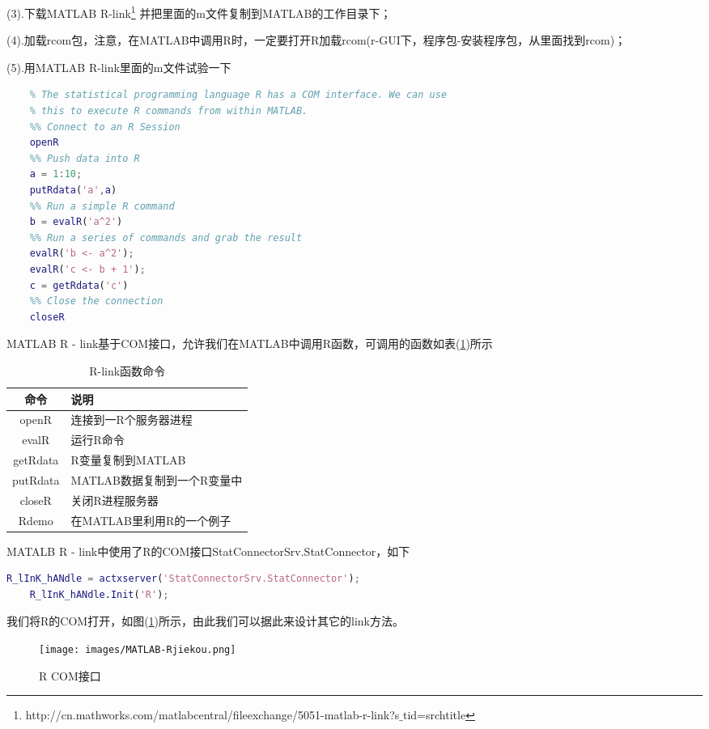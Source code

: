     \par
    \par
    (3).下载MATLAB R-link\footnote{http://cn.mathworks.com/matlabcentral/fileexchange/5051-matlab-r-link?s$\_$tid=srchtitle}
    并把里面的m文件复制到MATLAB的工作目录下；
    \par
    (4).加载rcom包，注意，在MATLAB中调用R时，一定要打开R加载rcom(r-GUI下，程序包-安装程序包，从里面找到rcom)；
    \par
    (5).用MATLAB R-link里面的m文件试验一下
    \begin{lstlisting}[language = Matlab]
    %% Connecting MATLAB to R
    % The statistical programming language R has a COM interface. We can use
    % this to execute R commands from within MATLAB.
    %% Connect to an R Session
    openR
    %% Push data into R
    a = 1:10;
    putRdata('a',a)
    %% Run a simple R command
    b = evalR('a^2')
    %% Run a series of commands and grab the result
    evalR('b <- a^2');
    evalR('c <- b + 1');
    c = getRdata('c')
    %% Close the connection
    closeR
    \end{lstlisting}
    \par
    MATLAB R - link基于COM接口，允许我们在MATLAB中调用R函数，可调用的函数如表(\ref{R-link函数命令})所示
    \begin{table}[H]
    \caption{R-link函数命令}
    \label{R-link函数命令}
    \centering
    \begin{tabular}{c|l}
        \toprule
        命令 & 说明  \\
        \midrule
        openR&     连接到一R个服务器进程\\
        evalR&     运行R命令\\
        getRdata&  R变量复制到MATLAB\\
        putRdata&  MATLAB数据复制到一个R变量中\\
        closeR&    关闭R进程服务器\\
        Rdemo&     在MATLAB里利用R的一个例子\\
        \bottomrule
    \end{tabular}
    \end{table}
    MATALB R - link中使用了R的COM接口StatConnectorSrv.StatConnector，如下
    \begin{lstlisting}[language = Matlab]
    R_lInK_hANdle = actxserver('StatConnectorSrv.StatConnector');
    R_lInK_hANdle.Init('R');
    \end{lstlisting}
    我们将R的COM打开，如图(\ref{MATLAB-R接口})所示，由此我们可以据此来设计其它的link方法。
    \begin{figure}[H]
    \centering
    \texttt{[image: images/MATLAB-Rjiekou.png]}
    \caption{R COM接口}
    \label{MATLAB-R接口}
    \end{figure}


